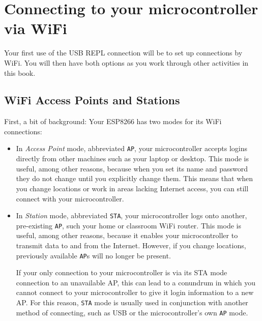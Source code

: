 \section{Connecting to your microcontroller via WiFi}
Your first use of the USB REPL connection will be to set up connections by WiFi.
You will then have both options as you work through other activities in this book.

\subsection{WiFi Access Points and Stations}
First, a bit of background: Your ESP8266 has two modes for its WiFi connections:
\begin{itemize}
	\item In \emph{Access Point} mode, abbreviated \texttt{AP}, your microcontroller accepts logins directly from other machines such as your laptop or desktop.
	This mode is useful, among other reasons, because when you set its name and password they do not change until you explicitly change them.
	This means that when you change locations or work in areas lacking Internet access, you can still connect with your microcontroller.

	\item In \emph{Station} mode, abbreviated \texttt{STA}, your microcontroller logs onto another, pre-existing \texttt{AP}, such your home or classroom WiFi router.
	This mode is useful, among other reasons, because it enables your microcontroller to transmit data to and from the Internet.
	However, if you change locations, previously available \texttt{AP}s will no longer be present.

	\smallskip
	If your only connection to your microcontroller is via its STA mode connection to an unavailable AP, this can lead to a conundrum in which you cannot connect to your microcontroller to give it login information to a new AP.
	For this reason, \texttt{STA} mode is usually used in conjunction with another method of connecting, such as USB or the microcontroller's own \texttt{AP} mode.

\end{itemize}

